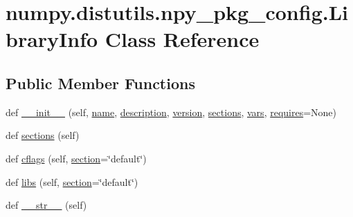 \hypertarget{classnumpy_1_1distutils_1_1npy__pkg__config_1_1LibraryInfo}{}\section{numpy.\+distutils.\+npy\+\_\+pkg\+\_\+config.\+Library\+Info Class Reference}
\label{classnumpy_1_1distutils_1_1npy__pkg__config_1_1LibraryInfo}
\subsection*{Public Member Functions}
\begin{DoxyCompactItemize}
\item 
def \hyperlink{classnumpy_1_1distutils_1_1npy__pkg__config_1_1LibraryInfo_ac5c2692bfa8b68a3b2c5fa167d4e46c8}{\+\_\+\+\_\+init\+\_\+\+\_\+} (self, \hyperlink{classnumpy_1_1distutils_1_1npy__pkg__config_1_1LibraryInfo_a36a7b6f0ecf3cc02c8c28b71faaa97e1}{name}, \hyperlink{classnumpy_1_1distutils_1_1npy__pkg__config_1_1LibraryInfo_af604254c7be202e2677f6b1d155f80c4}{description}, \hyperlink{classnumpy_1_1distutils_1_1npy__pkg__config_1_1LibraryInfo_a527640fd9e0c71c0d42c8b3d1f5d2f5d}{version}, \hyperlink{classnumpy_1_1distutils_1_1npy__pkg__config_1_1LibraryInfo_ac3aefff18e96597a820c5abf13bafa68}{sections}, \hyperlink{classnumpy_1_1distutils_1_1npy__pkg__config_1_1LibraryInfo_abbbe44c4870bfa86f0dbd7b7b27afc94}{vars}, \hyperlink{classnumpy_1_1distutils_1_1npy__pkg__config_1_1LibraryInfo_a786eccf7abb966fca0475a2c4d7882dc}{requires}=None)
\item 
def \hyperlink{classnumpy_1_1distutils_1_1npy__pkg__config_1_1LibraryInfo_ac3aefff18e96597a820c5abf13bafa68}{sections} (self)
\item 
def \hyperlink{classnumpy_1_1distutils_1_1npy__pkg__config_1_1LibraryInfo_ab17e6c642f429868938a40fe57f5b426}{cflags} (self, \hyperlink{namespacenumpy_1_1distutils_1_1npy__pkg__config_a7241ba52048f1f71984c38727b0c7b1d}{section}=\char`\"{}default\char`\"{})
\item 
def \hyperlink{classnumpy_1_1distutils_1_1npy__pkg__config_1_1LibraryInfo_a60a520165faf80f954b7ae4bc77bb2c8}{libs} (self, \hyperlink{namespacenumpy_1_1distutils_1_1npy__pkg__config_a7241ba52048f1f71984c38727b0c7b1d}{section}=\char`\"{}default\char`\"{})
\item 
def \hyperlink{classnumpy_1_1distutils_1_1npy__pkg__config_1_1LibraryInfo_aa9f5d1a85707ef8637d5549e6aa75423}{\+\_\+\+\_\+str\+\_\+\+\_\+} (self)
\end{DoxyCompactItemize}
